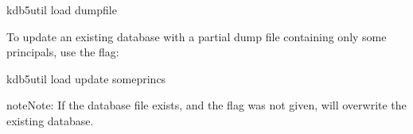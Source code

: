 \documentclass[letterpaper,10pt,english]{sphinxmanual}
\begin{document}
\begin{sphinxVerbatim}[commandchars=\\\{\}]
\PYGZdl{} kdb5\PYGZus{}util load dumpfile
\end{sphinxVerbatim}

\sphinxAtStartPar
To update an existing database with a partial dump file containing
only some principals, use the  flag:

\begin{sphinxVerbatim}[commandchars=\\\{\}]
\PYGZdl{} kdb5\PYGZus{}util load \PYGZhy{}update someprincs
\end{sphinxVerbatim}

\begin{sphinxadmonition}{note}{Note:}
\sphinxAtStartPar
If the database file exists, and the  flag was not
given,  will overwrite the existing database.
\end{sphinxadmonition}
\end{document}
